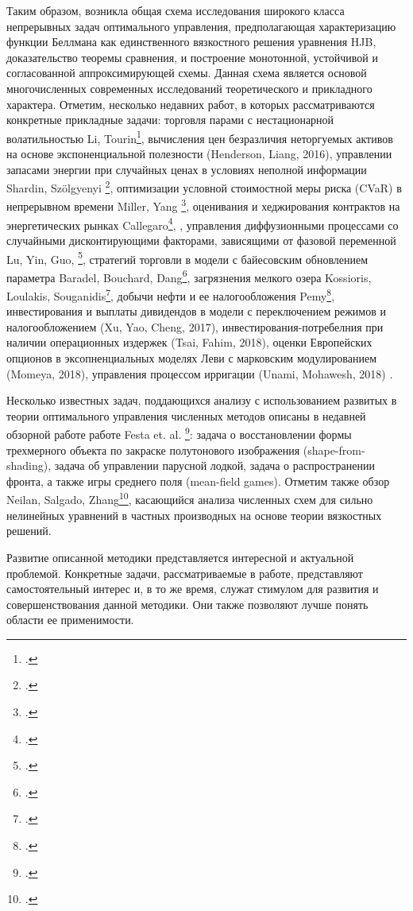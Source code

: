 \documentclass[twoside,12pt]{article}
\begin{document}
Таким образом, возникла общая схема исследования широкого класса непрерывных  задач оптимального управления, предполагающая характеризацию функции Беллмана как единственного вязкостного решения уравнения HJB, доказательство теоремы сравнения, и построение монотонной, устойчивой и согласованной аппроксимирующей схемы. Данная схема является основой многочисленных современных исследований теоретического и прикладного характера. Отметим, несколько недавних работ, в которых рассматриваются конкретные прикладные задачи: торговля парами с нестационарной волатильностью Li, Tourin\footcite{LiTour16}, вычисления цен безразличия неторгуемых активов на основе экспоненциальной полезности (Henderson, Liang, 2016), управлении запасами энергии при случайных ценах в условиях неполной информации Shardin, Sz{\"o}lgyenyi \footcite{ShaSzo16}, оптимизации условной стоимостной меры риска (CVaR) в непрерывном времени Miller, Yang \footcite{MilYan17}, оценивания и хеджирования контрактов на  энергетических рынках Callegaro\footcite{Callegaro2017}, , управления диффузионными процессами со случайными дисконтирующими факторами, зависящими от фазовой переменной Lu, Yin, Guo, \footcite{LuYinGuo17}, стратегий торговли в модели с байесовским обновлением параметра Baradel, Bouchard, Dang\footcite{BarBouDan16}, загрязнения мелкого озера Kossioris, Loulakis, Souganidis\footcite{KosLouSouPan17}, добычи нефти и ее налогообложения Pemy\footcite{Pemy17}, инвестирования и выплаты дивидендов в модели с переключением режимов и налогообложением (Xu, Yao, Cheng, 2017), инвестирования-потребелния при наличии операционных издержек (Tsai, Fahim, 2018), оценки Европейских опционов в эксопненциальных моделях Леви с марковским модулированием (Momeya, 2018), управления процессом ирригации (Unami, Mohawesh, 2018) . 

Несколько известных задач, поддающихся анализу с использованием развитых в теории оптимального управления численных методов описаны в недавней обзорной работе работе Festa et. al. \footcite{Festa17}: задача о восстановлении формы трехмерного объекта по закраске полутонового изображения (shape-from-shading), задача об управлении парусной лодкой, задача о распространении фронта, а также игры среднего поля (mean-field games). Отметим также обзор Neilan, Salgado, Zhang\footcite{NeiSalZha17}, касающийся анализа численных схем для сильно нелинейных уравнений в частных производных на основе теории вязкостных решений.

Развитие описанной методики представляется интересной и актуальной проблемой. Конкретные задачи, рассматриваемые в работе, представляют самостоятельный интерес и, в то же время, служат стимулом для развития и совершенствования данной методики. Они также позволяют лучше понять области ее применимости.
\end{document}
